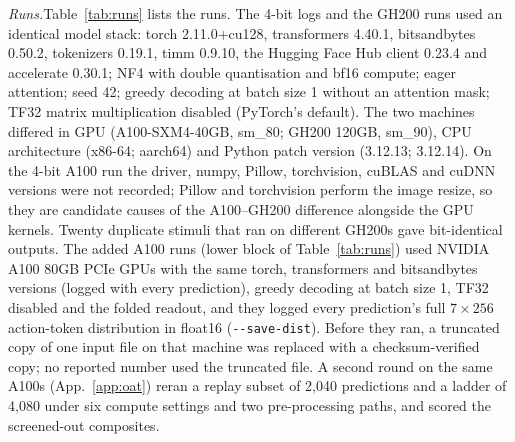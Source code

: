 \documentclass[conference]{IEEEtran}
\newcommand{\head}[1]{\textit{#1}\hspace{0.4em}}
\begin{document}
\head{Runs.}Table~\ref{tab:runs} lists the runs. The 4-bit logs and the GH200 runs used an identical model stack: torch 2.11.0+cu128, transformers 4.40.1, bitsandbytes 0.50.2, tokenizers 0.19.1, timm 0.9.10, the Hugging Face Hub client 0.23.4 and accelerate 0.30.1; NF4 with double quantisation and bf16 compute; eager attention; seed 42; greedy decoding at batch size 1 without an attention mask; TF32 matrix multiplication disabled (PyTorch's default). The two machines differed in GPU (A100-SXM4-40GB, sm\_80; GH200 120GB, sm\_90), CPU architecture (x86-64; aarch64) and Python patch version (3.12.13; 3.12.14). On the 4-bit A100 run the driver, numpy, Pillow, torchvision, cuBLAS and cuDNN versions were not recorded; Pillow and torchvision perform the image resize, so they are candidate causes of the A100--GH200 difference alongside the GPU kernels. Twenty duplicate stimuli that ran on different GH200s gave bit-identical outputs. The added A100 runs (lower block of Table~\ref{tab:runs}) used NVIDIA A100 80GB PCIe GPUs with the same torch, transformers and bitsandbytes versions (logged with every prediction), greedy decoding at batch size 1, TF32 disabled and the folded readout, and they logged every prediction's full $7\times256$ action-token distribution in float16 (\texttt{-{}-save-dist}). Before they ran, a truncated copy of one input file on that machine was replaced with a checksum-verified copy; no reported number used the truncated file. A second round on the same A100s (App.~\ref{app:oat}) reran a replay subset of 2,040 predictions and a ladder of 4,080 under six compute settings and two pre-processing paths, and scored the screened-out composites.
\end{document}
